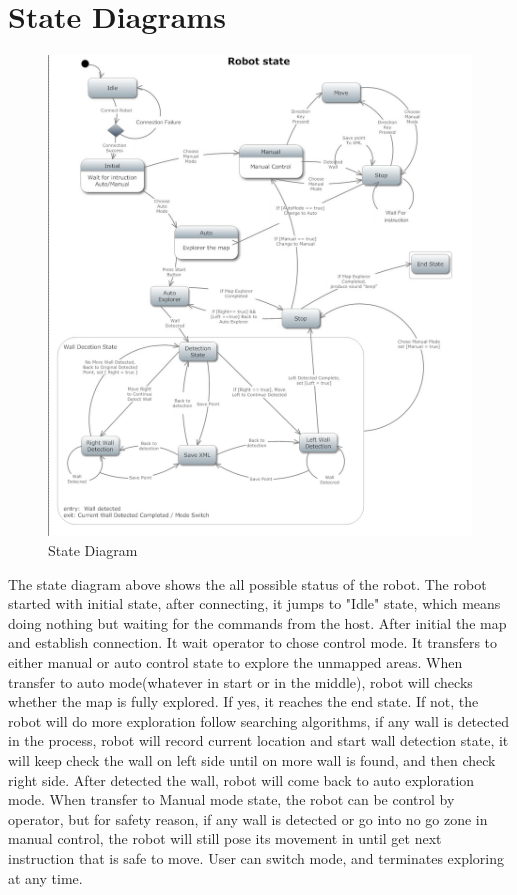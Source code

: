 \documentclass[11pt, a4paper]{report}
\begin{document}
\section{State Diagrams}
\begin{figure}[h]
  \centering
    \includegraphics[width=16cm]{SEP_13_RobotStateDiagram.jpg}
  \caption{State Diagram}
\end{figure}
The state diagram above shows the all possible status of the robot. The robot started with initial state, after connecting, it jumps to "Idle" state, which means doing nothing but waiting for the commands from the host. After initial the map and establish connection. It wait operator to chose control mode. It transfers to either manual or auto control state to explore the unmapped areas. When transfer to auto mode(whatever in start or in the middle), robot will checks whether the map is fully explored. If yes, it reaches the end state. If not, the robot will do more exploration follow searching algorithms, if any wall is detected in the process, robot will record current location and start wall detection state, it will keep check the wall on left side until on more wall is found, and then check right side. After detected the wall, robot will come back to auto exploration mode. When transfer to Manual mode state, the robot can be control by operator, but for safety reason, if any wall is detected or go into no go zone in manual control, the robot will still pose its movement in until get next instruction that is safe to move. User can switch mode, and terminates exploring at any time.
\newpage
\end{document}
